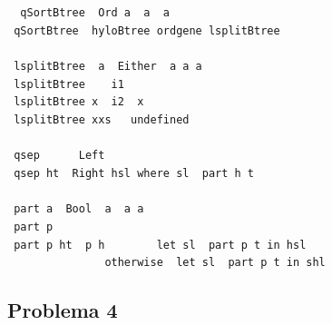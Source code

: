 \documentclass[a4paper]{article}
\begin{document}
\begin{tabbing}\tt
~qSortBtree~~Ord~a~~a~~a\\
\tt ~qSortBtree~~hyloBtree~ordgene~lsplitBtree\\
\tt ~\\
\tt ~lsplitBtree~~a~~Either~~a~a~a\\
\tt ~lsplitBtree~~~~i1~\\
\tt ~lsplitBtree~x~~i2~~x~\\
\tt ~lsplitBtree~xxs~~~undefined\\
\tt ~\\
\tt ~qsep~~~~~~Left~\\
\tt ~qsep~ht~~Right~hsl~where~sl~~part~h~t\\
\tt ~\\
\tt ~part~a~~Bool~~a~~a~a\\
\tt ~part~p~~~~~~~~~~~~~~~~~~\\
\tt ~part~p~ht~~p~h~~~~~~~~let~sl~~part~p~t~in~hsl\\
\tt ~~~~~~~~~~~~~~~otherwise~~let~sl~~part~p~t~in~shl
\end{tabbing}

\subsection*{Problema 4}
\end{document}
